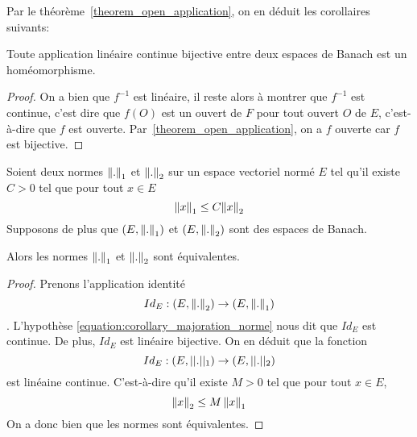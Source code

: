 Par le théorème~\ref{theorem_open_application}, on en déduit les corollaires
suivants:

\begin{corollary}
	Toute application linéaire continue bijective entre deux espaces de Banach
	est un homéomorphisme.
\end{corollary}

\ifdefined\outputproof
\begin{proof}
	On a bien que $f^{-1}$ est linéaire, il reste alors à montrer que $f^{-1}$
	est continue, c'est dire que $f(O)$ est un ouvert de $F$ pour tout ouvert
	$O$ de $E$, c'est-à-dire que $f$ est ouverte.
	Par~\ref{theorem_open_application}, on a $f$ ouverte car $f$ est bijective.
\end{proof}
\fi

\begin{corollary}
	Soient deux normes $\norm{.}_{1}$ et $\norm{.}_{2}$ sur un espace
	vectoriel norm\'e $E$ tel qu'il existe $C > 0$ tel que pour tout $x \in E$
	\begin{equation}
		\label{equation:corollary_majoration_norme}
		\norm{x}_{1} \leq C \norm{x}_{2}
	\end{equation}
	Supposons de plus que $(E, \norm{.}_{1})$ et
	$(E, \norm{.}_{2})$ sont des espaces de Banach.

	Alors les normes $\norm{.}_{1}$ et $\norm{.}_{2}$ sont équivalentes.
\end{corollary}

\ifdefined\outputproof
\begin{proof}
	Prenons l'application identité
	\begin{equation}
		Id_{E} : (E, \norm{.}_{2}) \rightarrow (E, \norm{.}_{1})
	\end{equation}.
	L'hypothèse \ref{equation:corollary_majoration_norme} nous dit que $Id_{E}$
	est continue.
	De plus, $Id_{E}$ est linéaire bijective.
	On en d\'eduit que la fonction
	\begin{equation}
		Id_{E} : (E, ||.||_{1}) \rightarrow (E, ||.||_{2})
	\end{equation}
	est linéaine continue. C'est-à-dire qu'il existe $M > 0
	$ tel que pour tout $x \in E$,
	\begin{equation}
		\norm{x}_{2} \leq M \, \norm{x}_{1}
	\end{equation}
	On a donc bien que les normes sont équivalentes.
\end{proof}
\fi

